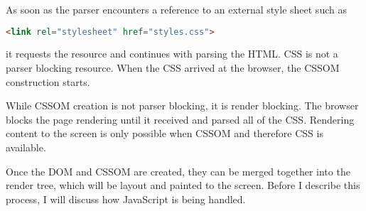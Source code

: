 
As soon as the parser encounters a reference to an external style sheet such as

\begin{lstlisting}[language=html, numbers=none]
<link rel="stylesheet" href="styles.css">
\end{lstlisting}

it requests the resource and continues with parsing the HTML.
CSS is not a parser blocking resource.
When the CSS arrived at the browser, the CSSOM construction starts.







While CSSOM creation is not parser blocking, it is render blocking.
The browser blocks the page rendering until it received and parsed all of the CSS.
Rendering content to the screen is only possible when CSSOM and therefore CSS is available. %



Once the DOM and CSSOM are created, they can be merged together into the render tree, which will be layout and painted to the screen.
Before I describe this process, I will discuss how JavaScript is being handled.












